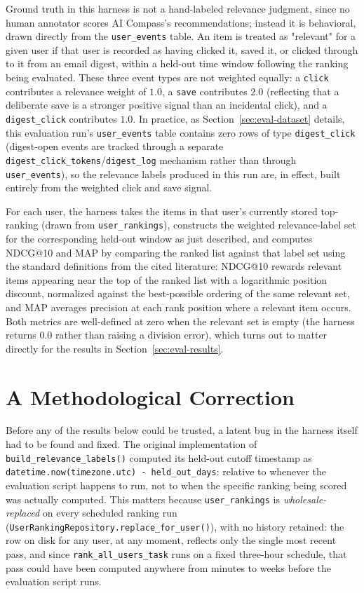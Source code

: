 Ground truth in this harness is not a hand-labeled relevance judgment, since no human annotator scores AI Compass's recommendations; instead it is behavioral, drawn directly from the \texttt{user\_events} table. An item is treated as "relevant" for a given user if that user is recorded as having clicked it, saved it, or clicked through to it from an email digest, within a held-out time window following the ranking being evaluated. These three event types are not weighted equally: a \texttt{click} contributes a relevance weight of $1.0$, a \texttt{save} contributes $2.0$ (reflecting that a deliberate save is a stronger positive signal than an incidental click), and a \texttt{digest\_click} contributes $1.0$. In practice, as Section~\ref{sec:eval-dataset} details, this evaluation run's \texttt{user\_events} table contains zero rows of type \texttt{digest\_click} (digest-open events are tracked through a separate \texttt{digest\_click\_tokens}/\texttt{digest\_log} mechanism rather than through \texttt{user\_events}), so the relevance labels produced in this run are, in effect, built entirely from the weighted click and save signal.

For each user, the harness takes the items in that user's currently stored top-ranking (drawn from \texttt{user\_rankings}), constructs the weighted relevance-label set for the corresponding held-out window as just described, and computes NDCG@10 and MAP by comparing the ranked list against that label set using the standard definitions from the cited literature: NDCG@10 rewards relevant items appearing near the top of the ranked list with a logarithmic position discount, normalized against the best-possible ordering of the same relevant set, and MAP averages precision at each rank position where a relevant item occurs. Both metrics are well-defined at zero when the relevant set is empty (the harness returns $0.0$ rather than raising a division error), which turns out to matter directly for the results in Section~\ref{sec:eval-results}.

\section{A Methodological Correction}
\label{sec:eval-correction}

Before any of the results below could be trusted, a latent bug in the harness itself had to be found and fixed. The original implementation of \texttt{build\_relevance\_labels()} computed its held-out cutoff timestamp as \texttt{datetime.now(timezone.utc) - held\_out\_days}: relative to whenever the evaluation script happens to run, not to when the specific ranking being scored was actually computed. This matters because \texttt{user\_rankings} is \emph{wholesale-replaced} on every scheduled ranking run (\texttt{UserRankingRepository.replace\_for\_user()}), with no history retained: the row on disk for any user, at any moment, reflects only the single most recent pass, and since \texttt{rank\_all\_users\_task} runs on a fixed three-hour schedule, that pass could have been computed anywhere from minutes to weeks before the evaluation script runs.

